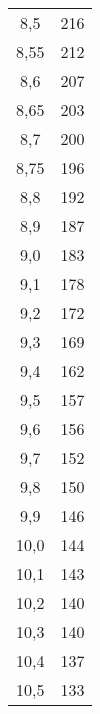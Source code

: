 \begin{longtable}{cc}
8,5  & 216\\
8,55 & 212\\
8,6  & 207\\
8,65 & 203\\
8,7  & 200\\
8,75 & 196\\
8,8  & 192\\
8,9  & 187\\
9,0  & 183\\
9,1  & 178\\
9,2  & 172\\
9,3  & 169\\
9,4  & 162\\
9,5  & 157\\
9,6  & 156\\
9,7  & 152\\
9,8  & 150\\
9,9  & 146\\
10,0 & 144\\
10,1 & 143\\
10,2 & 140\\
10,3 & 140\\
10,4 & 137\\
10,5 & 133\\
\end{longtable}
